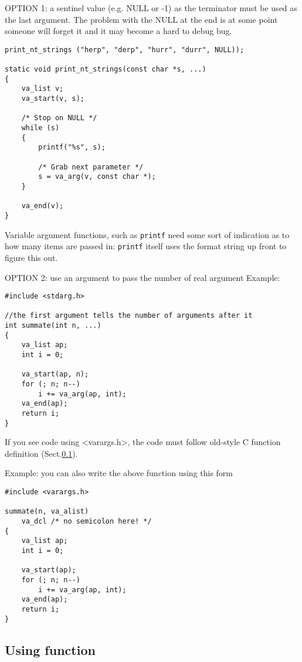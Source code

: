 OPTION 1: a sentinel value (e.g. NULL or -1) as the terminator must
be used as the last argument. The problem with the NULL at the end is at some
point someone will forget it and it may become a hard to debug bug.
\begin{verbatim}
print_nt_strings ("herp", "derp", "hurr", "durr", NULL));

static void print_nt_strings(const char *s, ...)
{
	va_list v;
	va_start(v, s);
	
	/* Stop on NULL */
	while (s)
	{
		printf("%s", s);
		
		/* Grab next parameter */
		s = va_arg(v, const char *);
	}
	
	va_end(v);
}
\end{verbatim}
Variable argument functions, such as \verb!printf! need some sort of indication
as to how many items are passed in: \verb!printf! itself uses the format string
up front to figure this out. 

OPTION 2: use an argument to pass the number of real argument
Example:
{\small \begin{verbatim}
#include <stdarg.h>
 
//the first argument tells the number of arguments after it
int summate(int n, ...)
{
    va_list ap;
    int i = 0;
 
    va_start(ap, n);
    for (; n; n--)
        i += va_arg(ap, int);
    va_end(ap);
    return i;
}
\end{verbatim} }

\begin{mdframed}
If you see code using <varargs.h>, the code must follow old-style C function
definition (Sect.\ref{sec:using_function_C89}).
\end{mdframed}

Example: you can also write the above function using this form 
{\small \begin{verbatim}
#include <varargs.h>
 
summate(n, va_alist)
    va_dcl /* no semicolon here! */
{
    va_list ap;
    int i = 0;
 
    va_start(ap);
    for (; n; n--)
        i += va_arg(ap, int);
    va_end(ap);
    return i;
}
\end{verbatim}}


\subsection{Using function}
\label{sec:using_function_C89}

